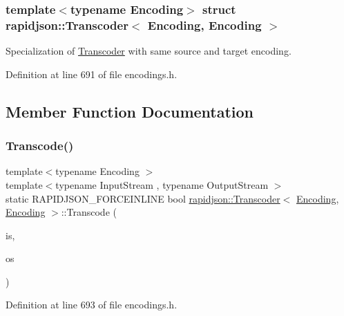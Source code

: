 \subsubsection*{template$<$typename Encoding$>$\newline
struct rapidjson\+::\+Transcoder$<$ Encoding, Encoding $>$}

Specialization of \mbox{\hyperlink{structrapidjson_1_1_transcoder}{Transcoder}} with same source and target encoding. 

Definition at line 691 of file encodings.\+h.



\subsection{Member Function Documentation}
\mbox{\label{structrapidjson_1_1_transcoder_3_01_encoding_00_01_encoding_01_4_a4c5e8e01daad553a941f5ea79c4a7339}} 
\subsubsection{\texorpdfstring{Transcode()}{Transcode()}}
{\footnotesize\ttfamily template$<$typename Encoding $>$ \\
template$<$typename Input\+Stream , typename Output\+Stream $>$ \\
static R\+A\+P\+I\+D\+J\+S\+O\+N\+\_\+\+F\+O\+R\+C\+E\+I\+N\+L\+I\+NE bool \mbox{\hyperlink{structrapidjson_1_1_transcoder}{rapidjson\+::\+Transcoder}}$<$ \mbox{\hyperlink{classrapidjson_1_1_encoding}{Encoding}}, \mbox{\hyperlink{classrapidjson_1_1_encoding}{Encoding}} $>$\+::Transcode (\begin{DoxyParamCaption}\item[{Input\+Stream \&}]{is,  }\item[{Output\+Stream \&}]{os }\end{DoxyParamCaption})\hspace{0.3cm}{\ttfamily [static]}}



Definition at line 693 of file encodings.\+h.


